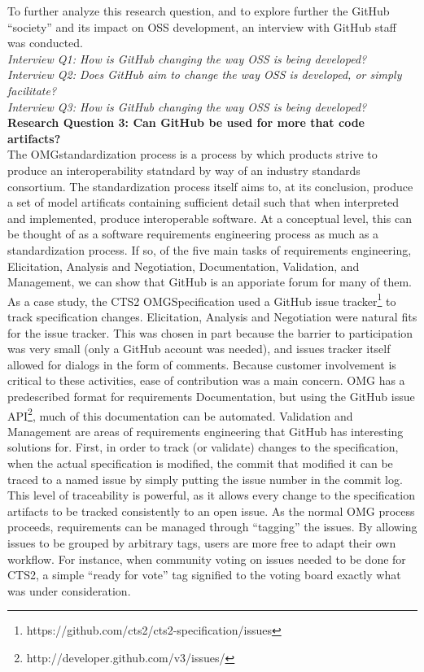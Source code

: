\documentclass{proc}
\begin{document}
To further analyze this research question, and to explore further the GitHub ``society'' and its impact on OSS development, an interview with GitHub staff was conducted.\\ 
\textit{Interview Q1: How is GitHub changing the way OSS is being developed?}\\

\textit{Interview Q2: Does GitHub aim to change the way OSS is developed, or simply facilitate?}\\

\textit{Interview Q3: How is GitHub changing the way OSS is being developed?}\\

\textbf{Research Question 3: Can GitHub be used for more that code artifacts?}\\
The OMG\textregistered standardization process is a process by which products strive to produce an interoperability statndard by way of an industry standards consortium.\cite{omgTechProcess}
The standardization process itself aims to, at its conclusion, produce a set of model artificats containing sufficient detail such that when interpreted and implemented, produce interoperable software.
At a conceptual level, this can be thought of as a software requirements engineering process as much as a standardization process. If so,  of the five main tasks of requirements engineering, Elicitation, Analysis and Negotiation, Documentation, Validation, and Management,\cite{sommerville1998requirements} we can show that GitHub is an apporiate forum for many of them.\\

As a case study, the CTS2 OMG\textregistered Specification\cite{cts2} used a GitHub issue tracker\footnote{https://github.com/cts2/cts2-specification/issues} to track specification changes. Elicitation, Analysis and Negotiation were natural fits for the issue tracker. This was chosen in part because the barrier to participation was very small (only a GitHub account was needed), and issues tracker itself allowed for dialogs in the form of comments. Because customer involvement is critical to these activities\cite{paetsch2003requirements}, ease of contribution was a main concern. OMG has a predescribed format for requirements Documentation, but using the GitHub issue API\footnote{http://developer.github.com/v3/issues/}, much of this documentation can be automated.
Validation and Management are areas of requirements engineering that GitHub has interesting solutions for. First, in order to track (or validate) changes to the specification, when the actual specification is modified, the commit that modified it can be traced to a named issue by simply putting the issue number in the commit log. This level of traceability is powerful, as it allows every change to the specification artifacts to be tracked consistently to an open issue. As the normal OMG process proceeds, requirements can be managed through ``tagging'' the issues. By allowing issues to be grouped by arbitrary tags, users are more free to adapt their own workflow. For instance, when community voting on issues needed to be done for CTS2, a simple ``ready for vote'' tag signified to the voting board exactly what was under consideration.
\end{document}
